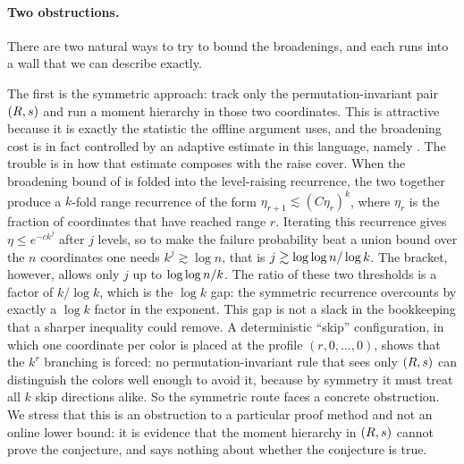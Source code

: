 \paragraph{Two obstructions.}
There are two natural ways to try to bound the broadenings, and each runs into a wall that we can describe exactly.

The first is the symmetric approach: track only the permutation-invariant pair $(R,s)$ and run a moment
hierarchy in those two coordinates. This is attractive because it is exactly the statistic the offline argument uses, and
the broadening cost is in fact controlled by an adaptive estimate in this language, namely . The trouble is in
how that estimate composes with the raise cover. When the broadening bound of  is folded into the level-raising
recurrence, the two together produce a $k$-fold range recurrence of the form $\eta_{r+1}\lesssim(C\eta_r)^k$, where $\eta_r$
is the fraction of coordinates that have reached range $r$. Iterating this recurrence gives $\eta\le e^{-ck^{j}}$ after $j$
levels, so to make the failure probability beat a union bound over the $n$ coordinates one needs $k^{j}\gtrsim\log n$, that
is $j\gtrsim\log\log n/\log k$. The bracket, however, allows only $j$ up to $\log\log n/k$. The ratio of these two thresholds
is a factor of $k/\log k$, which is the $\log k$ gap: the symmetric recurrence overcounts by exactly a $\log k$ factor in the
exponent. This gap is not a slack in the bookkeeping that a sharper inequality could remove. A deterministic ``skip''
configuration, in which one coordinate per color is placed at the profile $(r,0,\dots,0)$, shows that the $k^{r}$ branching is
forced: no permutation-invariant rule that sees only $(R,s)$ can distinguish the colors well enough to avoid
it, because by symmetry it must treat all $k$ skip directions alike. So the symmetric route faces a concrete obstruction. We
stress that this is an obstruction to a particular proof method and not an online lower bound: it is evidence that the moment
hierarchy in $(R,s)$ cannot prove the conjecture, and says nothing about whether the conjecture is true.


